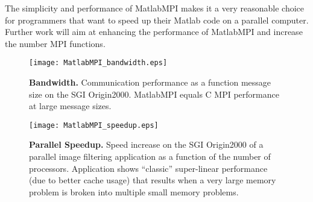 \documentclass[11pt]{article}
\begin{document}
  The simplicity and performance of MatlabMPI makes it a very reasonable
choice for programmers that want to speed up their Matlab code on a
parallel computer.  Further work will aim at enhancing the performance of
MatlabMPI and increase the number MPI functions.



\begin{figure}[tbh]
\centerline{\texttt{[image: MatlabMPI\_bandwidth.eps]}}
\caption{ {\bf Bandwidth.}
  Communication performance as a function message size on the SGI Origin2000.
MatlabMPI equals C MPI performance at large message sizes.
}
\label{fig:bandwidth}
\end{figure}

\begin{figure}[tbh]
\centerline{\texttt{[image: MatlabMPI\_speedup.eps]}}
\caption{ {\bf Parallel Speedup.}
  Speed increase on the SGI Origin2000 of a parallel image filtering
application as a function of the number of processors. Application shows
``classic'' super-linear performance (due to better cache usage) that
results when a very large memory problem is broken into multiple small
memory problems.
}
\label{fig:speedup}
\end{figure}

\newpage
\end{document}
